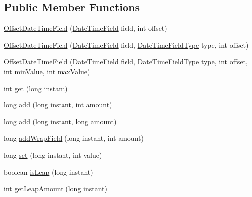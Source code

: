 \subsection*{Public Member Functions}
\begin{DoxyCompactItemize}
\item 
\hyperlink{classorg_1_1joda_1_1time_1_1field_1_1_offset_date_time_field_a6e11ff88fd7fa5dcc00fa7ea9d8bbedb}{Offset\-Date\-Time\-Field} (\hyperlink{classorg_1_1joda_1_1time_1_1_date_time_field}{Date\-Time\-Field} field, int offset)
\item 
\hyperlink{classorg_1_1joda_1_1time_1_1field_1_1_offset_date_time_field_a75ff1430cff61b3292f2fe433ea30cbf}{Offset\-Date\-Time\-Field} (\hyperlink{classorg_1_1joda_1_1time_1_1_date_time_field}{Date\-Time\-Field} field, \hyperlink{classorg_1_1joda_1_1time_1_1_date_time_field_type}{Date\-Time\-Field\-Type} type, int offset)
\item 
\hyperlink{classorg_1_1joda_1_1time_1_1field_1_1_offset_date_time_field_a84980f59b5fd8c111aef82285697b82c}{Offset\-Date\-Time\-Field} (\hyperlink{classorg_1_1joda_1_1time_1_1_date_time_field}{Date\-Time\-Field} field, \hyperlink{classorg_1_1joda_1_1time_1_1_date_time_field_type}{Date\-Time\-Field\-Type} type, int offset, int min\-Value, int max\-Value)
\item 
int \hyperlink{classorg_1_1joda_1_1time_1_1field_1_1_offset_date_time_field_acc5e5079abfdca1478f46e4a9f633097}{get} (long instant)
\item 
long \hyperlink{classorg_1_1joda_1_1time_1_1field_1_1_offset_date_time_field_a4819b8ad2439f306c6959a71de351ee5}{add} (long instant, int amount)
\item 
long \hyperlink{classorg_1_1joda_1_1time_1_1field_1_1_offset_date_time_field_a89c9e98745c8024d86bc32d09a0390fb}{add} (long instant, long amount)
\item 
long \hyperlink{classorg_1_1joda_1_1time_1_1field_1_1_offset_date_time_field_ae3a920c7edba334bda1b6b2d0646145c}{add\-Wrap\-Field} (long instant, int amount)
\item 
long \hyperlink{classorg_1_1joda_1_1time_1_1field_1_1_offset_date_time_field_afe8603c5a0bf138a712ee706ce3c25ac}{set} (long instant, int value)
\item 
boolean \hyperlink{classorg_1_1joda_1_1time_1_1field_1_1_offset_date_time_field_a75ee675ce01ae9e50bfadf87e8123401}{is\-Leap} (long instant)
\item 
int \hyperlink{classorg_1_1joda_1_1time_1_1field_1_1_offset_date_time_field_ad3c7d430f5db95abaa6321b002d3c879}{get\-Leap\-Amount} (long instant)

\end{DoxyCompactItemize}
